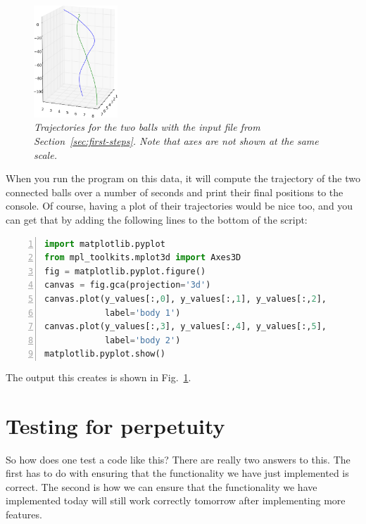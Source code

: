 \documentclass{article}
\begin{document}
\begin{figure}
  \begin{center}
    \vspace*{-24pt}
    \includegraphics[width=0.28\textwidth]{figures/testcase-1.png}
    \vspace*{-12pt}
  \end{center}
  \caption{\it Trajectories for the two balls with the input file from
    Section~\ref{sec:first-steps}. Note that axes are not shown at the same
    scale.}
  \vspace*{-3mm}
  \label{fig:testcase-1}
\end{figure}

When you run the program on this data, it will compute the trajectory of the
two connected balls over a number of seconds and print their final positions
to the console.
Of course, having a plot of their trajectories would be nice too, and you can
get that by adding the following lines to the bottom of the script:
\begin{lstlisting}[frame=single,basicstyle=\footnotesize,numbers=left,language=Python]
import matplotlib.pyplot
from mpl_toolkits.mplot3d import Axes3D
fig = matplotlib.pyplot.figure()
canvas = fig.gca(projection='3d')
canvas.plot(y_values[:,0], y_values[:,1], y_values[:,2],
            label='body 1')
canvas.plot(y_values[:,3], y_values[:,4], y_values[:,5], 
            label='body 2')
matplotlib.pyplot.show()
\end{lstlisting}
The output this creates is shown in Fig.~\ref{fig:testcase-1}.


\section{Testing for perpetuity}
\label{sec:testing}


So how does one test a code like this? There are really two answers to
this. The first has to do with ensuring that the functionality we have just
implemented is correct. The second is how we can ensure that the functionality
we have implemented today will still work correctly tomorrow after
implementing more features.
\end{document}
